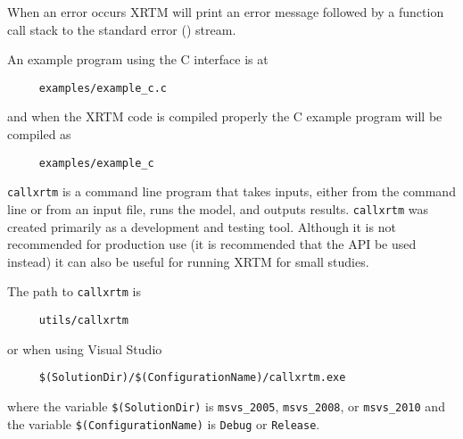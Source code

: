\noindent
When an error occurs XRTM will print an error message followed by a function call stack to the standard error () stream.


%
\label{xrtm_c_interface_example_c_program_using_xrtm}

An example program using the C interface is at
\begin{verbatim}
     examples/example_c.c
\end{verbatim}
and when the XRTM code is compiled properly the C example program will be compiled as
\begin{verbatim}
     examples/example_c
\end{verbatim}



%
\label{xrtm_utilities}


%
\label{xrtm_utilities_test_suite_testxrtms}

\label{xrtm_utilities_stand_alone_execution_callxrtm_testxrtm_options}


%
\label{xrtm_utilities_stand_alone_execution_callxrtm}

\texttt{callxrtm} is a command line program that takes inputs, either from the command line or from an input file, runs the model, and outputs results.  \texttt{callxrtm} was created primarily as a development and testing tool.  Although it is not recommended for production use (it is recommended that the API be used instead) it can also be useful for running XRTM for small studies.

\noindent
The path to \texttt{callxrtm} is 
\begin{verbatim}
     utils/callxrtm
\end{verbatim}
or when using Visual Studio
\begin{verbatim}
     $(SolutionDir)/$(ConfigurationName)/callxrtm.exe
\end{verbatim}
where the variable \texttt{\$(SolutionDir)} is \texttt{msvs\_2005}, \texttt{msvs\_2008}, or \texttt{msvs\_2010} and the variable \texttt{\$(ConfigurationName)} is \texttt{Debug} or \texttt{Release}.

